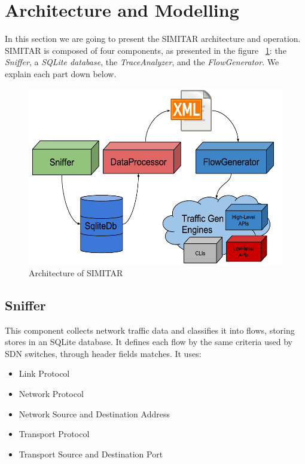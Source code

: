 \section{Architecture and Modelling}\label{sec:architecture}

In this section we are going to present the SIMITAR architecture and operation. SIMITAR is composed of four components, as presented in the figure ~\ref{fig:architecture}:  the \textit{Sniffer}, a \textit{SQLite database}, the \textit{TraceAnalyzer}, and the \textit{FlowGenerator}. We explain each part down below.

\begin{figure}[ht!]
        \centering
        \includegraphics[width=\linewidth]{figures/architecture-diagram}
        \caption{Architecture of SIMITAR}
    \label{fig:architecture}
\end{figure}


\subsection{Sniffer}


This component collects network traffic data and classifies it into flows, storing stores in an SQLite database. It defines each flow by the same criteria used by SDN switches\cite{sdn-survey},  through header fields matches. It uses:

\begin{itemize}
\item Link Protocol
\item Network Protocol
\item Network Source and Destination Address
\item Transport Protocol
\item Transport Source and Destination Port
\end{itemize}

